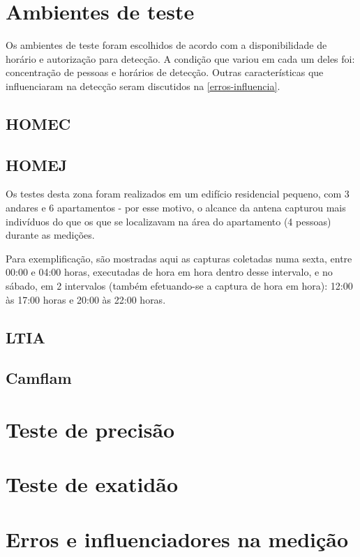 \section{Ambientes de teste}
Os ambientes de teste foram escolhidos de acordo com a disponibilidade de horário e autorização
para detecção. A condição que variou em cada um deles foi: concentração de pessoas e horários de detecção.
Outras características que influenciaram na detecção seram discutidos na \autoref{erros-influencia}.

\subsection{HOMEC}

\subsection{HOMEJ}
Os testes desta zona foram realizados em um edifício residencial pequeno, com 3
andares e 6 apartamentos - por esse motivo, o alcance da antena capturou mais
indivíduos do que os que se localizavam na área do apartamento (4 pessoas)
durante as medições.

Para exemplificação, são mostradas aqui as capturas coletadas numa sexta, entre
00:00 e 04:00 horas, executadas de hora em hora dentro desse intervalo, e no
sábado, em 2 intervalos (também efetuando-se a captura de hora em hora): 12:00
às 17:00 horas e 20:00 às 22:00 horas.

\subsection{LTIA}

\subsection{Camflam}

\section{Teste de precisão}

\section{Teste de exatidão}

\section{Erros e influenciadores na medição}
\label{erros-influencia}

%
%
